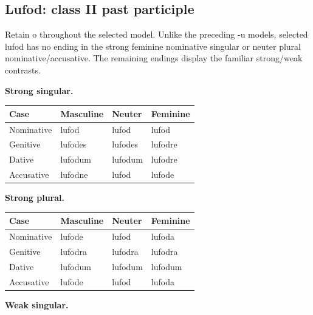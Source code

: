 \subsection*{Lufod: class II past participle}

Retain o throughout the selected model. Unlike the preceding -u models, selected lufod has no ending in the strong feminine nominative singular or neuter plural nominative/\allowbreak{}accusative. The remaining endings display the familiar strong/\allowbreak{}weak contrasts.

\textbf{Strong singular.}

\par\begingroup
\fontsize{10.5}{13.2}\selectfont
\setlength{\LTleft}{0pt}\setlength{\LTright}{\fill}
\noindent
\begin{tabular}{@{}>{\raggedright\arraybackslash}p{22.0mm}>{\raggedright\arraybackslash}p{31.188mm}>{\raggedright\arraybackslash}p{31.188mm}>{\raggedright\arraybackslash}p{31.188mm}@{}}
\toprule
\textbf{Case} & \textbf{Masculine} & \textbf{Neuter} & \textbf{Feminine} \\
\midrule
Nominative & lufod & lufod & lufod \\
Genitive & lufodes & lufodes & lufodre \\
Dative & lufodum & lufodum & lufodre \\
Accusative & lufodne & lufod & lufode \\
\bottomrule
\end{tabular}
\par\endgroup
\textbf{Strong plural.}

\par\begingroup
\fontsize{10.5}{13.2}\selectfont
\setlength{\LTleft}{0pt}\setlength{\LTright}{\fill}
\noindent
\begin{tabular}{@{}>{\raggedright\arraybackslash}p{22.0mm}>{\raggedright\arraybackslash}p{31.188mm}>{\raggedright\arraybackslash}p{31.188mm}>{\raggedright\arraybackslash}p{31.188mm}@{}}
\toprule
\textbf{Case} & \textbf{Masculine} & \textbf{Neuter} & \textbf{Feminine} \\
\midrule
Nominative & lufode & lufod & lufoda \\
Genitive & lufodra & lufodra & lufodra \\
Dative & lufodum & lufodum & lufodum \\
Accusative & lufode & lufod & lufoda \\
\bottomrule
\end{tabular}
\par\endgroup
\textbf{Weak singular.}

